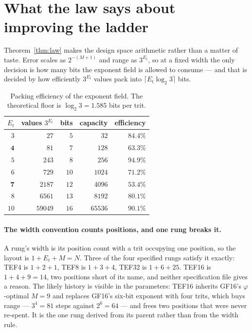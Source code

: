 \documentclass[11pt]{article}
\theoremstyle{definition}
\begin{document}
\section{What the law says about improving the ladder}\label{sec:design}

Theorem~\ref{thm:law} makes the design space arithmetic rather than a matter of
taste. Error scales as $2^{-(M+1)}$ and range as $3^{E_t}$, so at a fixed width
the only decision is how many bits the exponent field is allowed to consume ---
and that is decided by how efficiently $3^{E_t}$ values pack into
$\lceil E_t \log_2 3\rceil$ bits.

\begin{table}[t]\centering
\caption{Packing efficiency of the exponent field. The theoretical floor is
$\log_2 3 = 1.585$ bits per trit.}
\label{tab:pack}
\begin{tabular}{rrrrr}
\toprule
$E_t$ & values $3^{E_t}$ & bits & capacity & efficiency \\
\midrule
$3$  & $27$    & $5$  & $32$   & $84.4\%$ \\
$\mathbf{4}$  & $81$    & $7$  & $128$  & $\mathbf{63.3\%}$ \\
$5$  & $243$   & $8$  & $256$  & $\mathbf{94.9\%}$ \\
$6$  & $729$   & $10$ & $1024$ & $71.2\%$ \\
$\mathbf{7}$  & $2187$  & $12$ & $4096$ & $\mathbf{53.4\%}$ \\
$8$  & $6561$  & $13$ & $8192$ & $80.1\%$ \\
$10$ & $59049$ & $16$ & $65536$ & $90.1\%$ \\
\bottomrule
\end{tabular}
\end{table}

\paragraph{The width convention counts positions, and one rung breaks it.}
A rung's width is its position count with a trit occupying one position, so the
layout is $1 + E_t + M = N$. Three of the four specified rungs satisfy it exactly:
TEF4 is $1+2+1$, TEF8 is $1+3+4$, TEF32 is $1+6+25$. TEF16 is
$1+4+9 = 14$, two positions short of its name, and neither specification file
gives a reason. The likely history is visible in the parameters: TEF16 inherits
GF16's $\varphi$-optimal $M = 9$ and replaces GF16's six-bit exponent with four
trits, which buys range --- $3^4 = 81$ steps against $2^6 = 64$ --- and frees two
positions that were never re-spent. It is the one rung derived from its parent
rather than from the width rule.
\end{document}
